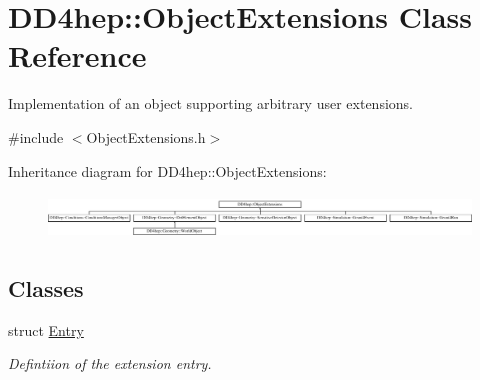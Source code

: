 \hypertarget{class_d_d4hep_1_1_object_extensions}{}\section{D\+D4hep\+:\+:Object\+Extensions Class Reference}
\label{class_d_d4hep_1_1_object_extensions}


Implementation of an object supporting arbitrary user extensions.  




{\ttfamily \#include $<$Object\+Extensions.\+h$>$}

Inheritance diagram for D\+D4hep\+:\+:Object\+Extensions\+:\begin{figure}[H]
\begin{center}
\leavevmode
\includegraphics[height=1.183099cm]{class_d_d4hep_1_1_object_extensions}
\end{center}
\end{figure}
\subsection*{Classes}
\begin{DoxyCompactItemize}
\item 
struct \hyperlink{struct_d_d4hep_1_1_object_extensions_1_1_entry}{Entry}
\begin{DoxyCompactList}\small\item\em Defintiion of the extension entry. \end{DoxyCompactList}\end{DoxyCompactItemize}
